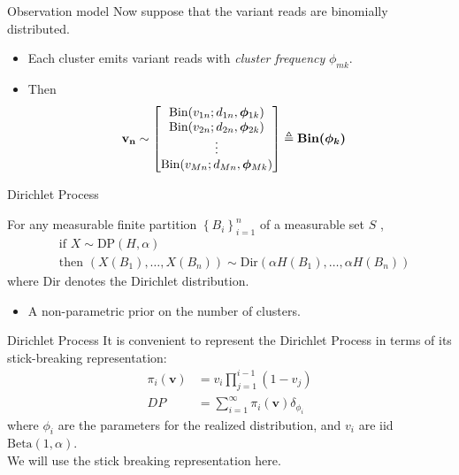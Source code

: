 \documentclass{beamer}
\newcommand{\bphi}{\ensuremath{\bm{\phi}}}
\begin{document}
\begin{frame}{Observation model}
Now suppose that the variant reads are binomially distributed.
\begin{itemize}
	\item<2-> Each cluster emits variant reads with \emph{cluster frequency} $\phi_{mk}$.
	\item<3-> Then \begin{align*}
	\bf{v}_{n} &\sim
				\begin{bmatrix}
					\mathrm{Bin}(v_{1n}; d_{1n}, \bphi_{1k}) \\ \mathrm{Bin}(v_{2n}; d_{2n}, \bphi_{2k}) \\ \vdots \\ \mathrm{Bin}(v_{Mn}; d_{Mn}, \bphi_{Mk})
				\end{bmatrix}
				\triangleq \bm{\mathrm{Bin}(\bphi_k)}
\end{align*}
\end{itemize}
\end{frame}

\begin{frame}{Dirichlet Process}
\begin{definition}
For any measurable finite partition $\left\{B_i\right\}_{i=1}^{n}$ of a measurable set $S$ ,
\begin{align*}
&\text{if } X \sim \mathrm{DP}\left(H, \alpha\right) \\
&\text{then }\left(X\left(B_1\right),\dots,X\left(B_n\right)\right) \sim \mathrm{Dir}\left(\alpha H\left(B_1\right),\dots, \alpha H\left(B_n\right)\right)
\end{align*}
where $\mathrm{Dir}$ denotes the Dirichlet distribution.
\end{definition}
\begin{itemize}
	\item<1-> A non-parametric prior on the number of clusters.
\end{itemize}
\end{frame}

\begin{frame}{Dirichlet Process}
It is convenient to represent the Dirichlet Process in terms of its stick-breaking representation:
\begin{align*}
\pi_i(\mathbf{v}) &= v_i \prod\limits_{j=1}^{i-1} (1 - v_j) \\
				DP &= \sum_{i=1}^\infty \pi_i(\mathbf{v}) \delta_{\phi_i}
\end{align*}
where $\phi_i$ are the parameters for the realized distribution, and $v_i$ are iid $\mathrm{Beta}(1, \alpha)$. \\[6pt]
We will use the stick breaking representation here.
\end{frame}
\end{document}
